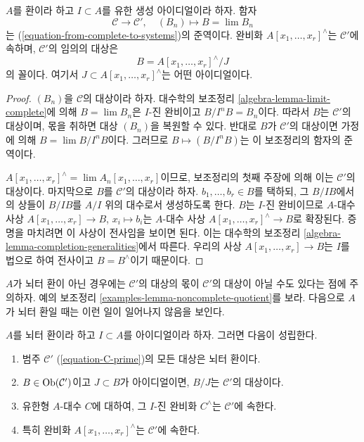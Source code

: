 \begin{lemma}
\label{lemma-topologically-finite-type}
$A$를 환이라 하고 $I \subset A$를 유한 생성 아이디얼이라 하자.
함자
$$
\mathcal{C} \longrightarrow \mathcal{C}',\quad
(B_n) \longmapsto B = \lim B_n
$$
는 (\ref{equation-from-complete-to-systems})의 준역이다.
완비화 $A[x_1, \ldots, x_r]^\wedge$는 $\mathcal{C}'$에 속하며,
$\mathcal{C}'$의 임의의 대상은
$$
B = A[x_1, \ldots, x_r]^\wedge / J
$$
의 꼴이다. 여기서 $J \subset A[x_1, \ldots, x_r]^\wedge$는 어떤 아이디얼이다.
\end{lemma}

\begin{proof}
$(B_n)$을 $\mathcal{C}$의 대상이라 하자. 대수학의 보조정리
\ref{algebra-lemma-limit-complete}에 의해
$B = \lim B_n$은 $I$-진 완비이고 $B/I^nB = B_n$이다.
따라서 $B$는 $\mathcal{C}'$의 대상이며, 몫을 취하면 대상 $(B_n)$을 복원할 수 있다.
반대로 $B$가 $\mathcal{C}'$의 대상이면 가정에 의해
$B = \lim B/I^nB$이다. 그러므로 $B \mapsto (B/I^nB)$는 이 보조정리의 함자의 준역이다.

\medskip\noindent
$A[x_1, \ldots, x_r]^\wedge = \lim A_n[x_1, \ldots, x_r]$이므로,
보조정리의 첫째 주장에 의해 이는 $\mathcal{C}'$의 대상이다.
마지막으로 $B$를 $\mathcal{C}'$의 대상이라 하자.
$b_1, \ldots, b_r \in B$를 택하되, 그 $B/IB$에서의 상들이
$B/IB$를 $A/I$ 위의 대수로서 생성하도록 한다.
$B$는 $I$-진 완비이므로 $A$-대수 사상
$A[x_1, \ldots, x_r] \to B$, $x_i \mapsto b_i$는
$A$-대수 사상 $A[x_1, \ldots, x_r]^\wedge \to B$로 확장된다.
증명을 마치려면 이 사상이 전사임을 보이면 된다.
이는 대수학의 보조정리 \ref{algebra-lemma-completion-generalities}에서 따른다.
우리의 사상 $A[x_1, \ldots, x_r] \to B$는 $I$를 법으로 하여 전사이고
$B = B^\wedge$이기 때문이다.
\end{proof}

\noindent
$A$가 뇌터 환이 아닌 경우에는 $\mathcal{C}'$의 대상의 몫이
$\mathcal{C}'$의 대상이 아닐 수도 있다는 점에 주의하자.
예의 보조정리 \ref{examples-lemma-noncomplete-quotient}를 보라.
다음으로 $A$가 뇌터 환일 때는 이런 일이 일어나지 않음을 보인다.

\begin{lemma}
\label{lemma-topologically-finite-type-Noetherian}
\begin{reference}
\cite[Proposition 7.5.5]{EGA1}
\end{reference}
$A$를 뇌터 환이라 하고 $I \subset A$를 아이디얼이라 하자. 그러면 다음이 성립한다.
\begin{enumerate}
\item 범주 $\mathcal{C}'$ (\ref{equation-C-prime})의 모든 대상은 뇌터 환이다.
\item $B \in \mathop{\mathrm{Ob}}\nolimits(\mathcal{C}')$이고 $J \subset B$가 아이디얼이면,
$B/J$는 $\mathcal{C}'$의 대상이다.
\item 유한형 $A$-대수 $C$에 대하여, 그 $I$-진 완비화
$C^\wedge$는 $\mathcal{C}'$에 속한다.
\item 특히 완비화 $A[x_1, \ldots, x_r]^\wedge$는 $\mathcal{C}'$에 속한다.
\end{enumerate}
\end{lemma}


